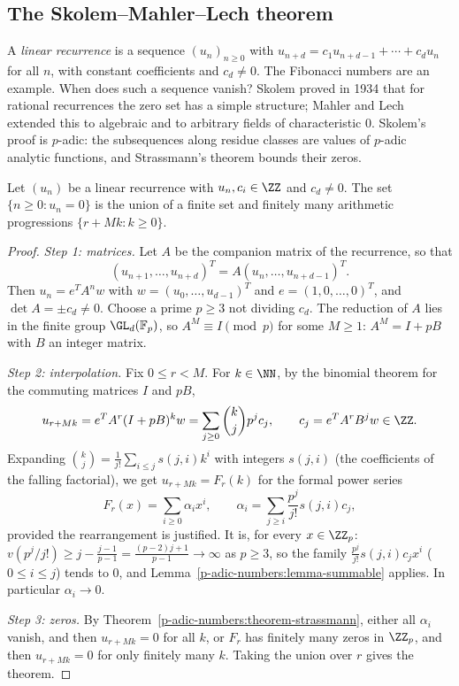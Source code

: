 \subsection{The Skolem--Mahler--Lech theorem}\label{p-adic-numbers:subsection-skolem}

A \emph{linear recurrence} is a sequence $(u_n)_{n \geq 0}$ with $u_{n+d} = c_1u_{n+d-1} + \cdots + c_du_n$ for all $n$, with constant coefficients and $c_d \neq 0$. The Fibonacci numbers are an example. When
does such a sequence vanish? Skolem proved in 1934 \cite{skolem-1934} that for rational recurrences the zero set has a simple structure; Mahler \cite{mahler-1935} and Lech \cite{lech-1953} extended this
to algebraic and to arbitrary fields of characteristic $0$. Skolem's proof is $p$-adic: the subsequences along residue classes are values of $p$-adic analytic functions, and Strassmann's theorem bounds
their zeros.

\begin{theorem}\label{p-adic-numbers:theorem-skolem}
Let $(u_n)$ be a linear recurrence with $u_n, c_i \in \ZZ$ and $c_d \neq 0$. The set $\{n \geq 0 : u_n = 0\}$ is the union of a finite set and finitely many arithmetic progressions
$\{r + Mk : k \geq 0\}$.
\end{theorem}

\begin{proof}
\emph{Step 1: matrices.} Let $A$ be the companion matrix of the recurrence, so that
\[
(u_{n+1}, \ldots, u_{n+d})^T = A(u_n, \ldots, u_{n+d-1})^T .
\]
Then $u_n = e^TA^nw$ with $w = (u_0, \ldots, u_{d-1})^T$ and
$e = (1, 0, \ldots, 0)^T$, and $\det A = \pm c_d \neq 0$. Choose a prime $p \geq 3$ not dividing $c_d$. The reduction of $A$ lies in the finite group $\GL_d(\mathbb{F}_p)$, so $A^M \equiv I \pmod p$ for some
$M \geq 1$: $A^M = I + pB$ with $B$ an integer matrix.

\emph{Step 2: interpolation.} Fix $0 \leq r < M$. For $k \in \NN$, by the binomial theorem for the commuting matrices $I$ and $pB$,
\[
u_{r + Mk} = e^TA^r(I + pB)^kw = \sum_{j \geq 0}\binom kjp^jc_j, \qquad c_j = e^TA^rB^jw \in \ZZ .
\]
Expanding $\binom kj = \frac{1}{j!}\sum_{i \leq j}s(j, i)k^i$ with integers $s(j, i)$ (the coefficients of the falling factorial), we get $u_{r+Mk} = F_r(k)$ for the formal power series
\[
F_r(x) = \sum_{i \geq 0}\alpha_ix^i, \qquad \alpha_i = \sum_{j \geq i}\frac{p^j}{j!}s(j, i)c_j ,
\]
provided the rearrangement is justified. It is, for every $x \in \ZZ_p$: $v(p^j/j!) \geq j - \frac{j - 1}{p - 1} = \frac{(p - 2)j + 1}{p - 1} \to \infty$ as $p \geq 3$, so the family
$\frac{p^j}{j!}s(j, i)c_jx^i$ ($0 \leq i \leq j$) tends to $0$, and Lemma~\ref{p-adic-numbers:lemma-summable} applies. In particular $\alpha_i \to 0$.

\emph{Step 3: zeros.} By Theorem~\ref{p-adic-numbers:theorem-strassmann}, either all $\alpha_i$ vanish, and then $u_{r + Mk} = 0$ for all $k$, or $F_r$ has finitely many zeros in $\ZZ_p$, and then $u_{r+Mk} = 0$ for
only finitely many $k$. Taking the union over $r$ gives the theorem.
\end{proof}

